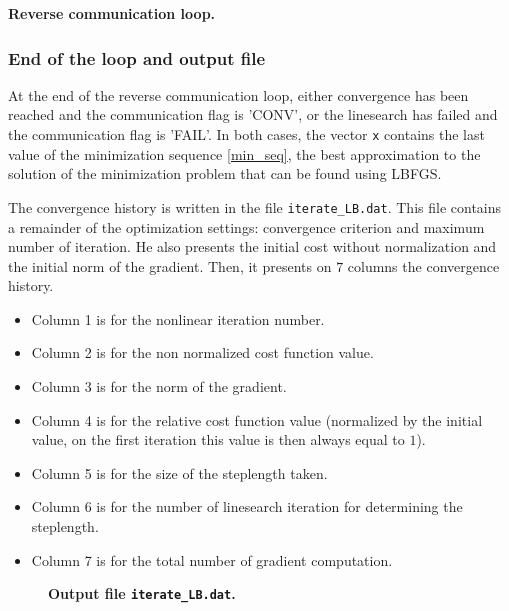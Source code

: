 \documentclass[a4paper,twoside,final,onecolumn,11pt,openright]{article}
\begin{document}
\framebox{
\small
 
}
\normalsize
\begin{center}
\textbf{Reverse communication loop.} 
\end{center}

\subsubsection{End of the loop and output file}
At the end of the reverse communication loop, either convergence has been reached and the communication flag is 'CONV', or the linesearch has failed and the communication flag is 'FAIL'. In both cases, the vector \texttt{x} contains the last value of the minimization sequence \eqref{min_seq}, the best approximation to the solution of the minimization problem that can be found using LBFGS. 

The convergence history is written in the file \texttt{iterate\_LB.dat}. This file contains a remainder of the optimization settings: convergence criterion and maximum number of iteration. He also presents the initial cost without normalization and the initial norm of the gradient. Then, it presents on $7$ columns the convergence history. 
\begin{itemize}
\item Column 1 is for the nonlinear iteration number.
\item Column 2 is for the non normalized cost function value.
\item Column 3 is for the norm of the gradient.
\item Column 4 is for the relative cost function value (normalized by the initial value, on the first iteration this value is then always equal to $1$).
\item Column 5 is for the size of the steplength taken.
\item Column 6 is for the number of linesearch iteration for determining the steplength.
\item Column 7 is for the total number of gradient computation.
\end{itemize}

\begin{figure}
\tiny
 
\normalsize
\begin{center}
\textbf{Output file \texttt{iterate\_LB.dat}.} 
\end{center}
 \end{figure}
\end{document}
